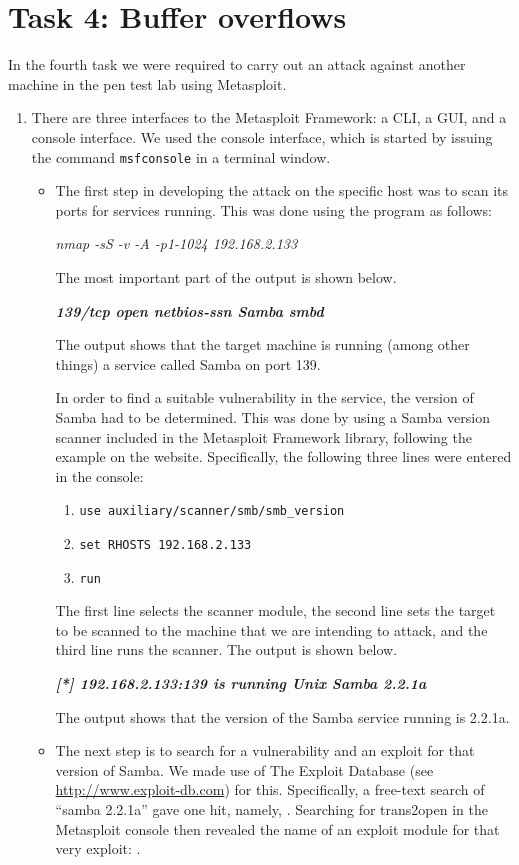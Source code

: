 \section*{Task 4: Buffer overflows}
In the fourth task we were required to carry out an attack against another machine in the pen test lab using Metasploit.
\begin{enumerate}
\item %
There are three interfaces to the Metasploit Framework: a CLI, a GUI, and a console interface\cite{metasploit}. We used the console interface, which is started by issuing the command \lstinline{msfconsole} in a terminal window.

\begin{itemize}  
\item The first step in developing the attack on the specific host was to scan its ports for services running. This was done using the program  as follows:

\textit{nmap -sS -v -A -p1-1024 192.168.2.133}

The most important part of the output is shown below.
  
{\bfseries{\textit{139/tcp open netbios-ssn Samba smbd}}} 
  
The output shows that the target machine is running (among other things) a service called Samba on port 139.
  
In order to find a suitable vulnerability in the service, the version of Samba had to be determined. This was done by using a Samba version scanner included in the Metasploit Framework library, following the example on the website\cite{metasploit}. Specifically, the following three lines were entered in the console:
\begin{enumerate}[1.]
\item \lstinline{use auxiliary/scanner/smb/smb_version}
\item \lstinline{set RHOSTS 192.168.2.133}
\item \lstinline{run}
\end{enumerate}
The first line selects the scanner module, the second line sets the target to be scanned to the machine that we are intending to attack, and the third line runs the scanner. The output is shown below.

{\bfseries{\textit{[*] 192.168.2.133:139 is running Unix Samba 2.2.1a}}}

The output shows that the version of the Samba service running is 2.2.1a.

\item The next step is to search for a vulnerability and an exploit for that version of Samba. We made use of The Exploit Database (see \url{http://www.exploit-db.com}) for this. Specifically, a free-text search of ``samba 2.2.1a'' gave one hit, namely, . Searching for trans2open in the Metasploit console then revealed the name of an exploit module for that very exploit: .


\end{itemize}
\end{enumerate}
